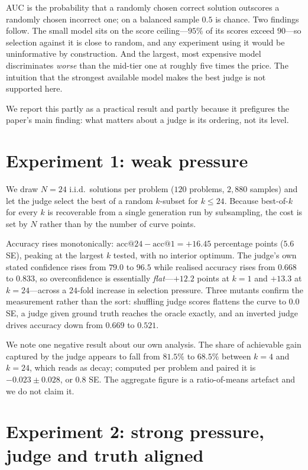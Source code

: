 \documentclass[10pt,twocolumn]{article}
\begin{document}
AUC is the probability that a randomly chosen correct solution outscores a randomly chosen incorrect one; on a balanced sample $0.5$ is chance. Two findings follow. The small model sits on the score ceiling---$95\%$ of its scores exceed $90$---so selection against it is close to random, and any experiment using it would be uninformative by construction. And the largest, most expensive model discriminates \emph{worse} than the mid-tier one at roughly five times the price. The intuition that the strongest available model makes the best judge is not supported here.

We report this partly as a practical result and partly because it prefigures the paper's main finding: what matters about a judge is its ordering, not its level.

\section{Experiment 1: weak pressure}

We draw $N=24$ i.i.d.\ solutions per problem ($120$ problems, $2{,}880$ samples) and let the judge select the best of a random $k$-subset for $k \le 24$. Because best-of-$k$ for every $k$ is recoverable from a single generation run by subsampling, the cost is set by $N$ rather than by the number of curve points.

Accuracy rises monotonically: $\text{acc}@24 - \text{acc}@1 = +16.45$ percentage points ($5.6$ SE), peaking at the largest $k$ tested, with no interior optimum. The judge's own stated confidence rises from $79.0$ to $96.5$ while realised accuracy rises from $0.668$ to $0.833$, so overconfidence is essentially \emph{flat}---$+12.2$ points at $k{=}1$ and $+13.3$ at $k{=}24$---across a $24$-fold increase in selection pressure. Three mutants confirm the measurement rather than the sort: shuffling judge scores flattens the curve to $0.0$ SE, a judge given ground truth reaches the oracle exactly, and an inverted judge drives accuracy down from $0.669$ to $0.521$.

We note one negative result about our own analysis. The share of achievable gain captured by the judge appears to fall from $81.5\%$ to $68.5\%$ between $k{=}4$ and $k{=}24$, which reads as decay; computed per problem and paired it is $-0.023 \pm 0.028$, or $0.8$ SE. The aggregate figure is a ratio-of-means artefact and we do not claim it.

\section{Experiment 2: strong pressure, judge and truth aligned}
\end{document}

